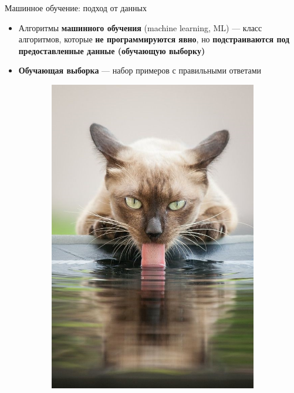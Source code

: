 \documentclass[aspectratio=169]{beamer}
\begin{document}
\begin{frame}{Машинное обучение: подход от данных}
    \begin{itemize}
        \item Алгоритмы \textbf{машинного обучения} (machine learning, ML) ---
        класс алгоритмов, которые \textbf{не программируются явно}, но
        \textbf{подстраиваются под предоставленные данные (обучающую выборку)}
        \pause{}
        \item \textbf{Обучающая выборка} --- набор примеров с правильными
        ответами
    \end{itemize}
    \begin{figure}
        \begin{subfigure}[b]{.1\linewidth}
            \includegraphics[width=\linewidth]{graphs/fig14_0.jpg}

\end{subfigure}
\end{figure}
\end{frame}
\end{document}
